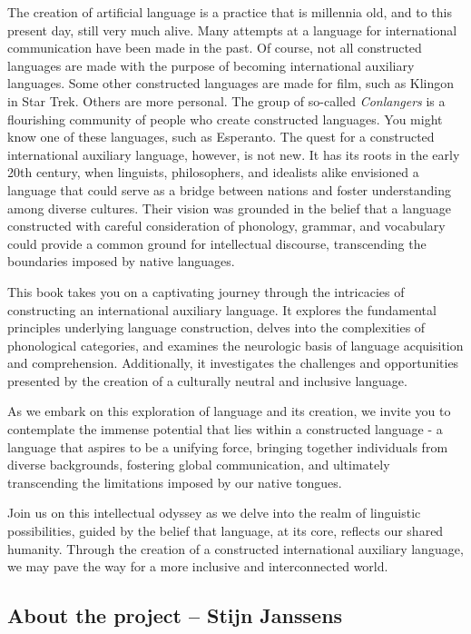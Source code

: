 The creation of artificial language is a practice that is millennia old, and to
this present day, still very much alive. Many attempts at a language for
international communication have been made in the past. Of course, not all
constructed languages are made with the purpose of becoming international
auxiliary languages. Some other constructed languages are made for film, such
as Klingon in Star Trek. Others are more personal. The group of so-called {\it Conlangers} is a flourishing
community of people who create constructed languages. You might know one of
these languages, such as Esperanto. The quest for a constructed international
auxiliary language, however, is not new. It has its roots in the early 20th
century, when linguists, philosophers, and idealists alike envisioned a
language that could serve as a bridge between nations and foster understanding
among diverse cultures. Their vision was grounded in the belief that a language
constructed with careful consideration of phonology, grammar, and vocabulary
could provide a common ground  for intellectual discourse, transcending the
boundaries imposed by native languages.


This book takes you on a captivating journey through the intricacies of constructing an international auxiliary language. It explores the fundamental principles underlying language construction, delves into the complexities of phonological categories, and examines the neurologic basis of language acquisition and comprehension. Additionally, it investigates the challenges and opportunities presented by the creation of a culturally neutral and inclusive language. 

As we embark on this exploration of language and its creation, we invite you to contemplate the immense potential that lies within a constructed language - a language that aspires to be a unifying force, bringing together individuals from diverse backgrounds, fostering global communication, and ultimately transcending the limitations imposed by our native tongues. 

Join us on this intellectual odyssey as we delve into the realm of linguistic possibilities, guided by the belief that language, at its core, reflects our shared humanity. Through the creation of a constructed international auxiliary language, we may pave the way for a more inclusive and interconnected world. 

\vfill 

\subsection{About the project -- {\small Stijn Janssens}}

